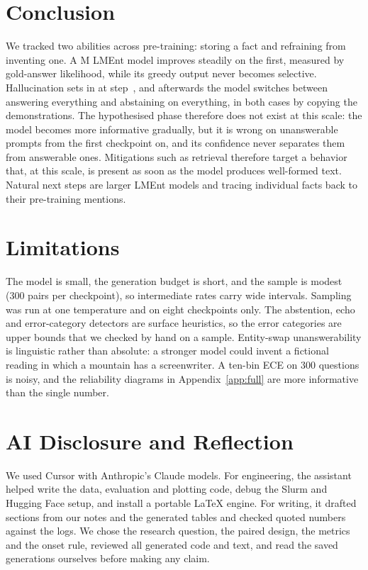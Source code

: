 \documentclass[11pt]{article}
\begin{document}
\section{Conclusion}

We tracked two abilities across pre-training: storing a fact and refraining from inventing one. A \resModelParams{}M LMEnt model improves steadily on the first, measured by gold-answer likelihood, while its greedy output never becomes selective. Hallucination sets in at step~\resOnsetStep{}, and afterwards the model switches between answering everything and abstaining on everything, in both cases by copying the demonstrations. The hypothesised phase therefore does not exist at this scale: the model becomes more informative gradually, but it is wrong on unanswerable prompts from the first checkpoint on, and its confidence never separates them from answerable ones. Mitigations such as retrieval \citep{lewis2020rag} therefore target a behavior that, at this scale, is present as soon as the model produces well-formed text. Natural next steps are larger LMEnt models and tracing individual facts back to their pre-training mentions.

\section*{Limitations}

The model is small, the generation budget is short, and the sample is modest (300 pairs per checkpoint), so intermediate rates carry wide intervals. Sampling was run at one temperature and on eight checkpoints only. The abstention, echo and error-category detectors are surface heuristics, so the error categories are upper bounds that we checked by hand on a sample. Entity-swap unanswerability is linguistic rather than absolute: a stronger model could invent a fictional reading in which a mountain has a screenwriter. A ten-bin ECE on 300 questions is noisy, and the reliability diagrams in Appendix~\ref{app:full} are more informative than the single number.

\section*{AI Disclosure and Reflection}

We used Cursor with Anthropic's Claude models. For engineering, the assistant helped write the data, evaluation and plotting code, debug the Slurm and Hugging Face setup, and install a portable \LaTeX{} engine. For writing, it drafted sections from our notes and the generated tables and checked quoted numbers against the logs. We chose the research question, the paired design, the metrics and the onset rule, reviewed all generated code and text, and read the saved generations ourselves before making any claim.
\end{document}
